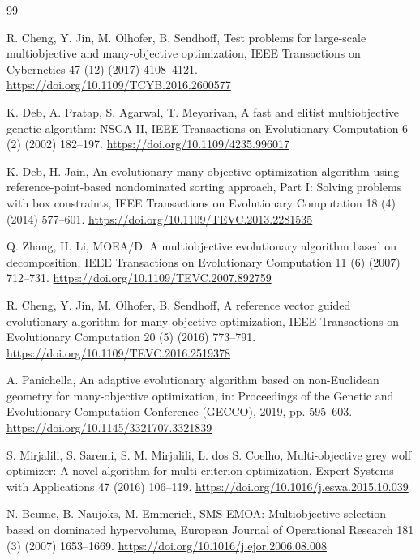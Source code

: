 \documentclass[preprint,12pt]{elsarticle}
\begin{document}
\begin{thebibliography}{99}

R. Cheng, Y. Jin, M. Olhofer, B. Sendhoff, Test problems for large-scale
multiobjective and many-objective optimization, IEEE Transactions on
Cybernetics 47 (12) (2017) 4108--4121.
\url{https://doi.org/10.1109/TCYB.2016.2600577}

K. Deb, A. Pratap, S. Agarwal, T. Meyarivan, A fast and elitist
multiobjective genetic algorithm: NSGA-II, IEEE Transactions on Evolutionary
Computation 6 (2) (2002) 182--197.
\url{https://doi.org/10.1109/4235.996017}

K. Deb, H. Jain, An evolutionary many-objective optimization algorithm using
reference-point-based nondominated sorting approach, Part I: Solving problems
with box constraints, IEEE Transactions on Evolutionary Computation 18 (4)
(2014) 577--601. \url{https://doi.org/10.1109/TEVC.2013.2281535}

Q. Zhang, H. Li, MOEA/D: A multiobjective evolutionary algorithm based on
decomposition, IEEE Transactions on Evolutionary Computation 11 (6) (2007)
712--731. \url{https://doi.org/10.1109/TEVC.2007.892759}

R. Cheng, Y. Jin, M. Olhofer, B. Sendhoff, A reference vector guided
evolutionary algorithm for many-objective optimization, IEEE Transactions on
Evolutionary Computation 20 (5) (2016) 773--791.
\url{https://doi.org/10.1109/TEVC.2016.2519378}

A. Panichella, An adaptive evolutionary algorithm based on non-Euclidean
geometry for many-objective optimization, in: Proceedings of the Genetic and
Evolutionary Computation Conference (GECCO), 2019, pp. 595--603.
\url{https://doi.org/10.1145/3321707.3321839}

S. Mirjalili, S. Saremi, S. M. Mirjalili, L. dos S. Coelho, Multi-objective
grey wolf optimizer: A novel algorithm for multi-criterion optimization,
Expert Systems with Applications 47 (2016) 106--119.
\url{https://doi.org/10.1016/j.eswa.2015.10.039}

N. Beume, B. Naujoks, M. Emmerich, SMS-EMOA: Multiobjective selection based
on dominated hypervolume, European Journal of Operational Research 181 (3)
(2007) 1653--1669. \url{https://doi.org/10.1016/j.ejor.2006.08.008}


\end{thebibliography}
\end{document}
